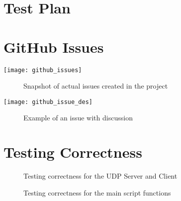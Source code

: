 \begin{appendices}

%
\chapter{Test Plan}
\label{ref:testplan}


%
\chapter{GitHub Issues}
\begin{center}
	\label{ref:GitHubAppendix}
	\texttt{[image: github\_issues]}
	\begin{figure}[h]
		\caption{Snapshot of actual issues created in the project}
		\label{ref:GitHubIssues}
	\end{figure}			
\end{center}

\begin{center}
	\texttt{[image: github\_issue\_des]}
	\begin{figure}[h]
		\caption{Example of an issue with discussion}
		\label{ref:GitHubIssueExample}
	\end{figure}	
\end{center}

%
\chapter{Testing Correctness}
\begin{center}
	\label{ref:testingCorrect}
	
	\begin{figure}[h]
		\caption{Testing correctness for the UDP Server and Client}
		\label{ref:testingUDP}
	\end{figure}
	
		
	\begin{figure}[h]
		\caption{Testing correctness for the main script functions}	
		\label{ref:testingScript}
	\end{figure}
\end{center}
\end{appendices}
